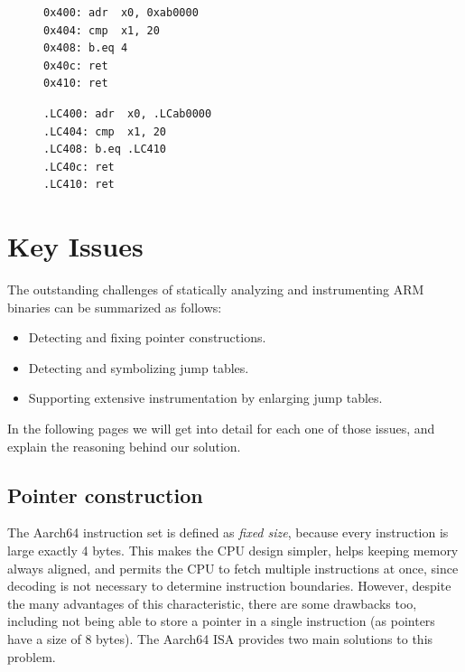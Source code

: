 \documentclass[a4paper,11pt,oneside]{report}
\begin{document}
\begin{figure}[h]
\begin{minipage}{.45\textwidth}

\begin{lstlisting}
0x400: adr  x0, 0xab0000
0x404: cmp  x1, 20
0x408: b.eq 4
0x40c: ret
0x410: ret
\end{lstlisting}


\end{minipage}\hfill
\begin{minipage}{.45\textwidth}

\begin{lstlisting}
.LC400: adr  x0, .LCab0000
.LC404: cmp  x1, 20
.LC408: b.eq .LC410
.LC40c: ret
.LC410: ret
\end{lstlisting}

\end{minipage}
\label{diffass}
\end{figure}



\section{Key Issues}
The outstanding challenges of statically analyzing and instrumenting ARM 
binaries can be summarized as follows:

\begin{itemize}
	\item Detecting and fixing pointer constructions.
	\item Detecting and symbolizing jump tables.
	\item Supporting extensive instrumentation by enlarging jump tables.  
\end{itemize}

In the following pages we will get into detail for each one of those issues, 
and explain the reasoning behind our solution.

\subsection{Pointer construction}
The Aarch64 instruction set is defined as \emph{fixed size}, because every 
instruction is large exactly 4 bytes. This makes the CPU design simpler,
helps keeping memory always aligned, and permits the CPU to fetch multiple 
instructions at once, since decoding is not necessary to determine instruction 
boundaries. However, despite the many advantages of this characteristic, there 
are some drawbacks too, including not being able to store a pointer in a single 
instruction (as pointers have a size of 8 bytes). The Aarch64 ISA provides two 
main solutions to this problem. 
\end{document}
